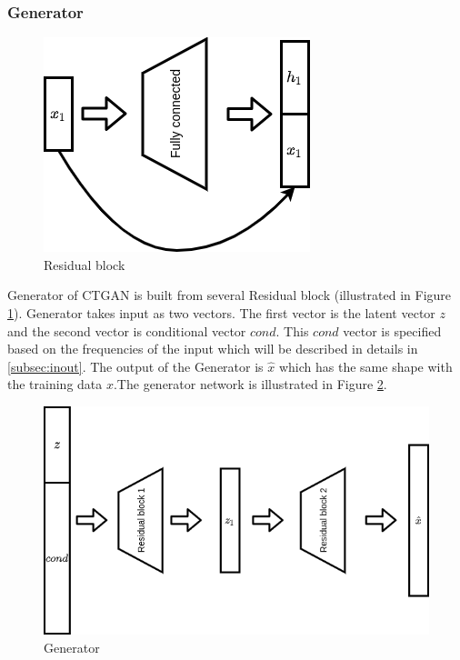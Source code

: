 \documentclass{article}
\begin{document}
\subsubsection{Generator}
\begin{figure}[h]
	\centering
	\includegraphics[scale=0.4]{figures/res.png}
	\caption{Residual block}
	\label{fig:res}
\end{figure}

Generator of \ac{CTGAN} is built from several Residual block (illustrated in Figure \ref{fig:res}). Generator takes input as two vectors. The first vector is the latent vector $z$ and the second vector is conditional vector $cond$. This $cond$ vector is specified based on the frequencies of the input which will be described in details in \ref{subsec:inout}. The output of the Generator is $\hat{x}$ which has the same shape with the training data $x$.The generator network is illustrated in Figure \ref{fig:gen}. 

\begin{figure}[h]
	\centering
	\includegraphics[scale=0.4]{figures/gen.png}
	\caption{Generator}
	\label{fig:gen}
\end{figure}
\end{document}
